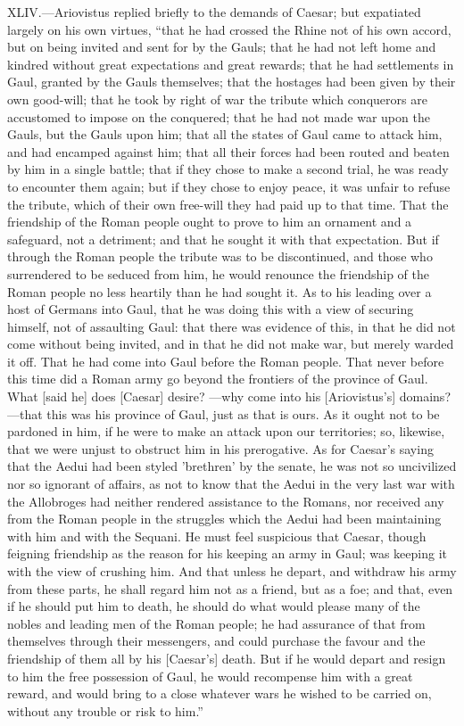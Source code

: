 XLIV.—Ariovistus replied briefly to the demands of Caesar; but
expatiated largely on his own virtues, ``that he had crossed the Rhine
not of his own accord, but on being invited and sent for by the Gauls;
that he had not left home and kindred without great expectations and
great rewards; that he had settlements in Gaul, granted by the Gauls
themselves; that the hostages had been given by their own good-will;
that he took by right of war the tribute which conquerors are accustomed
to impose on the conquered; that he had not made war upon the Gauls, but
the Gauls upon him; that all the states of Gaul came to attack him, and
had encamped against him; that all their forces had been routed and
beaten by him in a single battle; that if they chose to make a second
trial, he was ready to encounter them again; but if they chose to enjoy
peace, it was unfair to refuse the tribute, which of their own free-will
they had paid up to that time. That the friendship of the Roman people
ought to prove to him an ornament and a safeguard, not a detriment; and
that he sought it with that expectation. But if through the Roman people
the tribute was to be discontinued, and those who surrendered to be
seduced from him, he would renounce the friendship of the Roman people
no less heartily than he had sought it. As to his leading over a host of
Germans into Gaul, that he was doing this with a view of securing
himself, not of assaulting Gaul: that there was evidence of this, in
that he did not come without being invited, and in that he did not make
war, but merely warded it off. That he had come into Gaul before the
Roman people. That never before this time did a Roman army go beyond the
frontiers of the province of Gaul. What [said he] does [Caesar] desire?
—why come into his [Ariovistus's] domains?—that this was his province
of Gaul, just as that is ours. As it ought not to be pardoned in him, if
he were to make an attack upon our territories; so, likewise, that we
were unjust to obstruct him in his prerogative. As for Caesar's saying
that the Aedui had been styled 'brethren' by the senate, he was not so
uncivilized nor so ignorant of affairs, as not to know that the Aedui in
the very last war with the Allobroges had neither rendered assistance to
the Romans, nor received any from the Roman people in the struggles
which the Aedui had been maintaining with him and with the Sequani. He
must feel suspicious that Caesar, though feigning friendship as the
reason for his keeping an army in Gaul; was keeping it with the view of
crushing him. And that unless he depart, and withdraw his army from
these parts, he shall regard him not as a friend, but as a foe; and
that, even if he should put him to death, he should do what would please
many of the nobles and leading men of the Roman people; he had assurance
of that from themselves through their messengers, and could purchase the
favour and the friendship of them all by his [Caesar's] death. But if he
would depart and resign to him the free possession of Gaul, he would
recompense him with a great reward, and would bring to a close whatever
wars he wished to be carried on, without any trouble or risk to him.''

